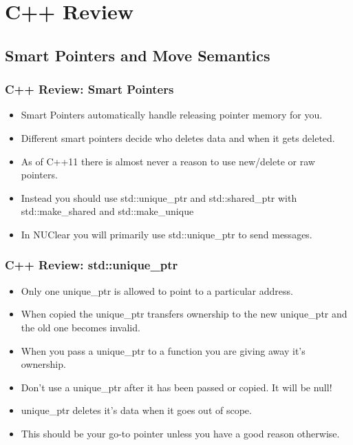 \documentclass{beamer}
\begin{document}
\section{C++ Review}
\subsection{Smart Pointers and Move Semantics}
\begin{frame}
	\frametitle{C++ Review: Smart Pointers}
	\begin{itemize}
		\item Smart Pointers automatically handle releasing pointer memory for you.
		\item Different smart pointers decide who deletes data and when it gets deleted.
		\item As of C++11 there is almost never a reason to use new/delete or raw pointers.
		\item Instead you should use std::unique\_ptr and std::shared\_ptr with std::make\_shared and std::make\_unique
		\item In NUClear you will primarily use std::unique\_ptr to send messages.
	\end{itemize}
\end{frame}

\begin{frame}
	\frametitle{C++ Review: std::unique\_ptr}
	\begin{itemize}
		\item Only one unique\_ptr is allowed to point to a particular address.
		\item When copied the unique\_ptr transfers ownership to the new unique\_ptr and the old one becomes invalid.
		\item When you pass a unique\_ptr to a function you are giving away it's ownership.
		\item Don't use a unique\_ptr after it has been passed or copied. It will be null!
		\item unique\_ptr deletes it's data when it goes out of scope. 
		\item This should be your go-to pointer unless you have a good reason otherwise.
	\end{itemize}
\end{frame}
\end{document}
